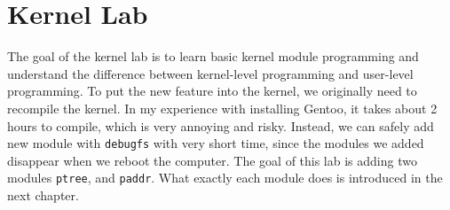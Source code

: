 \chapter{Kernel Lab}
The goal of the kernel lab is to learn basic kernel module programming and understand the difference between kernel-level programming and user-level programming.
To put the new feature into the kernel, we originally need to recompile the kernel.
In my experience with installing Gentoo, it takes about 2 hours to compile, which is very annoying and risky.
Instead, we can safely add new module with \texttt{debugfs} with very short time, since the modules we added disappear when we reboot the computer.
The goal of this lab is adding two modules \texttt{ptree}, and \texttt{paddr}.
What exactly each module does is introduced in the next chapter.